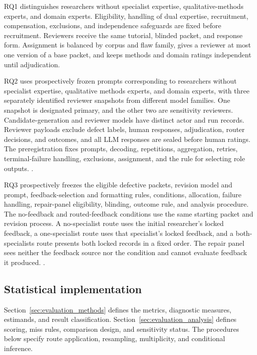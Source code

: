 RQ1 distinguishes researchers without specialist expertise, qualitative-methods experts, and domain experts. Eligibility, handling of dual expertise, recruitment, compensation, exclusions, and independence safeguards are fixed before recruitment. Reviewers receive the same tutorial, blinded packet, and response form. Assignment is balanced by corpus and flaw family, gives a reviewer at most one version of a base packet, and keeps methods and domain ratings independent until adjudication.

RQ2 uses prospectively frozen prompts corresponding to researchers without specialist expertise, qualitative methods experts, and domain experts, with three separately identified reviewer snapshots from different model families. One snapshot is designated primary, and the other two are sensitivity reviewers. Candidate-generation and reviewer models have distinct actor and run records. Reviewer payloads exclude defect labels, human responses, adjudication, router decisions, and outcomes, and all LLM responses are sealed before human ratings. The preregistration fixes prompts, decoding, repetitions, aggregation, retries, terminal-failure handling, exclusions, assignment, and the rule for selecting role outputs. .

RQ3 prospectively freezes the eligible defective packets, revision model and prompt, feedback-selection and formatting rules, conditions, allocation, failure handling, repair-panel eligibility, blinding, outcome rule, and analysis procedure. The no-feedback and routed-feedback conditions use the same starting packet and revision process. A no-specialist route uses the initial researcher's locked feedback, a one-specialist route uses that specialist's locked feedback, and a both-specialists route presents both locked records in a fixed order. The repair panel sees neither the feedback source nor the condition and cannot evaluate feedback it produced. .

\subsection{Statistical implementation}
\label{sec:artifact_metrics}

Section~\ref{sec:evaluation_methods} defines the metrics, diagnostic measures, estimands, and result classification. Section~\ref{sec:evaluation_analysis} defines scoring, miss rules, comparison design, and sensitivity status. The procedures below specify route application, resampling, multiplicity, and conditional inference.

